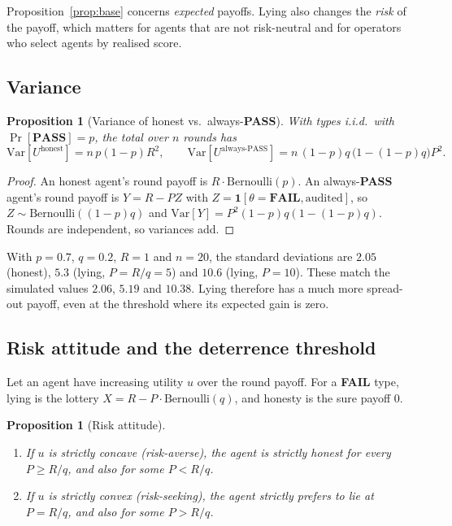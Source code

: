 \documentclass[11pt]{article}
\newtheorem{proposition}[theorem]{Proposition}
\theoremstyle{definition}
\theoremstyle{remark}
\newcommand{\PASS}{\textbf{PASS}}
\newcommand{\FAIL}{\textbf{FAIL}}
\newcommand{\1}{\mathbf{1}}
\begin{document}
Proposition~\ref{prop:base} concerns \emph{expected} payoffs. Lying also changes the
\emph{risk} of the payoff, which matters for agents that are not risk-neutral and for
operators who select agents by realised score.

\subsection{Variance}

\begin{proposition}[Variance of honest vs.\ always-\PASS{}]\label{prop:var}
With types i.i.d.\ with $\Pr[\PASS]=p$, the total over $n$ rounds has
\[
\mathrm{Var}[U^{\text{honest}}]=n\,p(1-p)R^2,\qquad
\mathrm{Var}[U^{\text{always-PASS}}]=n\,(1-p)q\,\big(1-(1-p)q\big)P^2 .
\]
\end{proposition}

\begin{proof}
An honest agent's round payoff is $R\cdot\mathrm{Bernoulli}(p)$. An always-\PASS{}
agent's round payoff is $Y=R-PZ$ with $Z=\1[\theta=\FAIL,\text{audited}]$, so
$Z\sim\mathrm{Bernoulli}((1-p)q)$ and $\mathrm{Var}[Y]=P^2(1-p)q(1-(1-p)q)$. Rounds are
independent, so variances add.
\end{proof}

With $p=0.7$, $q=0.2$, $R=1$ and $n=20$, the standard deviations are $2.05$ (honest),
$5.3$ (lying, $P=R/q=5$) and $10.6$ (lying, $P=10$). These match the simulated values
$2.06$, $5.19$ and $10.38$. Lying therefore has a much more spread-out payoff, even at
the threshold where its expected gain is zero.

\subsection{Risk attitude and the deterrence threshold}

Let an agent have increasing utility $u$ over the round payoff. For a \FAIL{} type,
lying is the lottery $X=R-P\cdot\mathrm{Bernoulli}(q)$, and honesty is the sure
payoff $0$.

\begin{proposition}[Risk attitude]\label{prop:risk}
\begin{enumerate}[label=(\alph*)]
    \item If $u$ is strictly concave (risk-averse), the agent is strictly honest for every
    $P\ge R/q$, and also for some $P<R/q$.
    \item If $u$ is strictly convex (risk-seeking), the agent strictly prefers to lie at
    $P=R/q$, and also for some $P>R/q$.
\end{enumerate}
\end{proposition}
\end{document}
